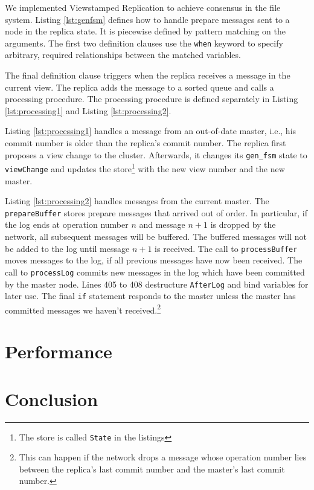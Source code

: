\documentclass[10pt,letter]{article}
\begin{document}
We implemented Viewstamped Replication\cite{liskov2012viewstamped} to achieve
consensus in the file system. Listing \ref{lst:genfsm} defines how to handle
prepare messages sent to a node in the replica state. It is piecewise defined by
pattern matching on the arguments. The first two definition clauses use the
\lstinline!when! keyword to specify arbitrary, required relationships between
the matched variables.

The final definition clause triggers when the replica receives a message in the
current view. The replica adds the message to a sorted queue and calls a
processing procedure. The processing procedure is defined separately in Listing
\ref{lst:processing1} and Listing \ref{lst:processing2}.

Listing \ref{lst:processing1} handles a message from an out-of-date master,
i.e., his commit number is older than the replica's commit number. The replica
first proposes a view change to the cluster. Afterwards, it changes its
\texttt{gen\_fsm} state to \lstinline!viewChange! and updates the
store\footnote{The store is called \lstinline!State! in the listings} with the
new view number and the new master.

Listing \ref{lst:processing2} handles messages from the current master. The
\lstinline!prepareBuffer! stores prepare messages that arrived out of order. In
particular, if the log ends at operation number $n$ and message $n+1$ is dropped
by the network, all subsequent messages will be buffered. The buffered messages
will not be added to the log until message $n+1$ is received. The call to
\lstinline!processBuffer! moves messages to the log, if all previous messages
have now been received. The call to \lstinline!processLog! commits new messages
in the log which have been committed by the master node. Lines 405 to 408
destructure \lstinline!AfterLog! and bind variables for later use. The final
\lstinline!if! statement responds to the master unless the master has committed
messages we haven't received.\footnote{This can happen if the network drops a message whose
  operation number lies between the replica's last commit number and the
  master's last commit number.}

\section{Performance}

\section{Conclusion}



\end{document}

